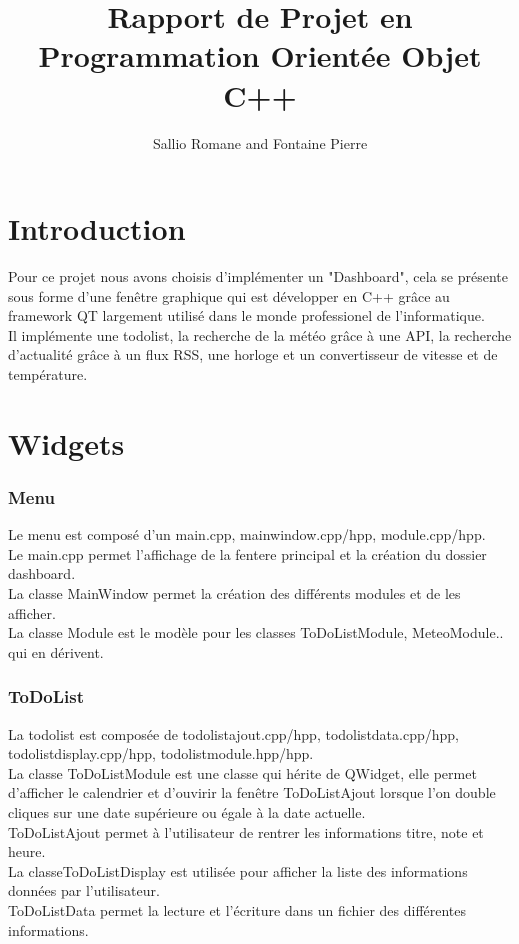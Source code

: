 \documentclass[12pt]{report}
\title{Rapport de Projet en Programmation Orientée Objet C++}
\author{Sallio Romane and Fontaine Pierre}
\begin{document}
  \maketitle
  \newpage
  \tableofcontents
  \part{Introduction}
    Pour ce projet nous avons choisis d'implémenter un "Dashboard", cela se présente sous forme d'une fenêtre graphique qui est développer en C++ grâce au framework QT largement utilisé dans le monde professionel de l'informatique.\\
    Il implémente une todolist, la recherche de la météo grâce à une API, la recherche d'actualité grâce à un flux RSS, une horloge et un convertisseur de vitesse et de température.
  \part{Widgets}
    \section{Menu}
      Le menu est composé d'un main.cpp, mainwindow.cpp/hpp, module.cpp/hpp.\\
      Le main.cpp permet l'affichage de la fentere principal et la création du dossier dashboard.\\
      La classe MainWindow permet la création des différents modules et de les afficher.\\
      La classe Module est le modèle pour les classes ToDoListModule, MeteoModule.. qui en dérivent.\\
    \section{ToDoList}
      La todolist est composée de todolistajout.cpp/hpp, todolistdata.cpp/hpp, todolistdisplay.cpp/hpp, todolistmodule.hpp/hpp.\\
      La classe ToDoListModule est une classe qui hérite de QWidget, elle permet d'afficher le calendrier et d'ouvirir la fenêtre ToDoListAjout lorsque l'on double cliques sur une date supérieure ou égale à la date actuelle.\\
      ToDoListAjout permet à l'utilisateur de rentrer les informations titre, note et heure.\\
      La classeToDoListDisplay est utilisée pour afficher la liste des informations données par l'utilisateur.\\
      ToDoListData permet la lecture et l'écriture dans un fichier des différentes informations.
\end{document}
